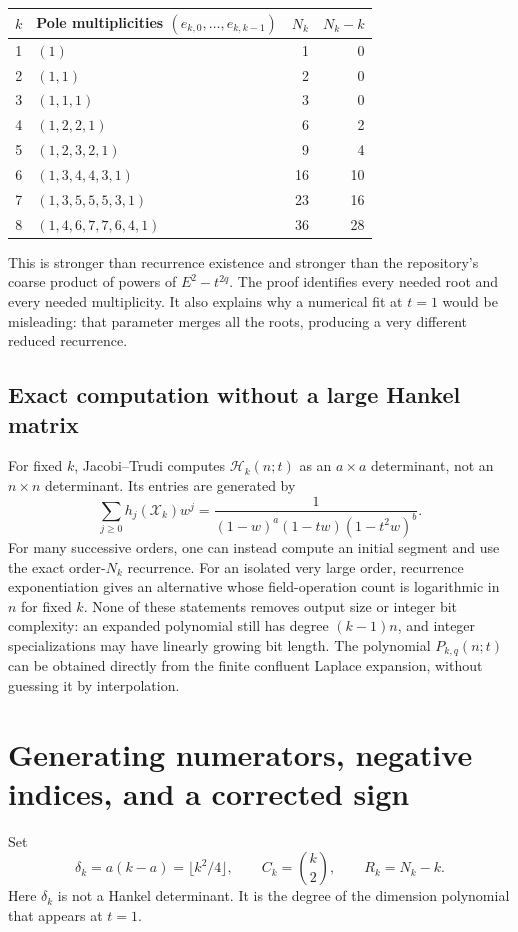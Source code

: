 \documentclass[11pt]{article}
\theoremstyle{definition}
\theoremstyle{remark}
\newcommand{\Ht}{\mathcal H}
\newcommand{\XX}{\mathcal X}
\theoremstyle{definition}
\theoremstyle{plain}
\numberwithin{equation}{section}
\begin{document}
\begin{center}
\begin{tabular}{@{}c l r r@{}}
\toprule
$k$ & Pole multiplicities $(e_{k,0},\ldots,e_{k,k-1})$ & $N_k$ & $N_k-k$\\
\midrule
1 & $(1)$ & 1 & 0\\
2 & $(1,1)$ & 2 & 0\\
3 & $(1,1,1)$ & 3 & 0\\
4 & $(1,2,2,1)$ & 6 & 2\\
5 & $(1,2,3,2,1)$ & 9 & 4\\
6 & $(1,3,4,4,3,1)$ & 16 & 10\\
7 & $(1,3,5,5,5,3,1)$ & 23 & 16\\
8 & $(1,4,6,7,7,6,4,1)$ & 36 & 28\\
\bottomrule
\end{tabular}
\end{center}

This is stronger than recurrence existence and stronger than the repository's
coarse product of powers of $E^2-t^{2q}$. The proof identifies every needed
root and every needed multiplicity. It also explains why a numerical fit
at $t=1$ would be misleading: that parameter merges all the roots, producing
a very different reduced recurrence.

\subsection{Exact computation without a large Hankel matrix}
For fixed $k$, Jacobi--Trudi computes $\Ht_k(n;t)$ as an $a\times a$
determinant, not an $n\times n$ determinant. Its entries are generated by
\begin{equation}
 \sum_{j\ge0}h_j(\XX_k)w^j
 =\frac1{(1-w)^a(1-tw)(1-t^2w)^b}.
 \label{rs:eq:h-generating}
\end{equation}
For many successive orders, one can instead compute an initial segment and
use the exact order-$N_k$ recurrence. For an isolated very large order,
recurrence exponentiation gives an alternative whose field-operation count
is logarithmic in $n$ for fixed $k$. None of these statements removes output
size or integer bit complexity: an expanded polynomial still has degree
$(k-1)n$, and integer specializations may have linearly growing bit length.
The polynomial $P_{k,q}(n;t)$ can be obtained directly from the finite
confluent Laplace expansion, without guessing it by interpolation.

\section{Generating numerators, negative indices, and a corrected sign}
\label{rs:sec:numerator}
Set
\begin{equation}
 \delta_k=a(k-a)=\lfloor k^2/4\rfloor,\qquad
 C_k=\binom k2,\qquad R_k=N_k-k.
 \label{rs:eq:deltaR}
\end{equation}
Here $\delta_k$ is not a Hankel determinant. It is the degree of the dimension
polynomial that appears at $t=1$.
\end{document}

